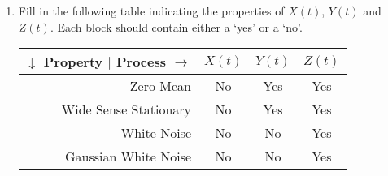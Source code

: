 \begin{enumerate}
  \item Fill in the following table indicating the properties of $X(t)$, $Y(t)$ and $Z(t)$. Each block should contain either a `yes' or a `no'.

    \begin{tabular}{|r||c|c|c|}\hline
      $\downarrow$ Property $|$ Process $\rightarrow$                     & $X(t)$    &  $Y(t)$   & $Z(t)$    \\ \hline
      Zero Mean                                                           & No        &  Yes      & Yes       \\ \hline
      Wide Sense Stationary                                               & No        &  Yes      & Yes       \\ \hline
      White Noise                                                         & No        &  No       & Yes       \\ \hline
      Gaussian White Noise                                                & No        &  No       & Yes       \\ \hline
    \end{tabular}
  \end{enumerate}





